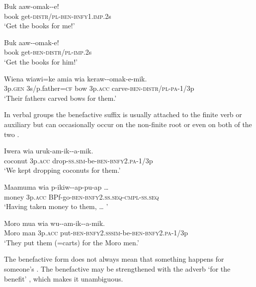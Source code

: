 \ea%
\label{ex:3:x1925}
\gll Buk aaw-omak--e! \\
book get-\textsc{distr}/\textsc{pl}-\textsc{ben}-\textsc{bnfy}1.\textsc{imp}.2s\\
\glt`Get the books for me!'
\z

\ea%
\label{ex:3:x211}
\gll Buk aaw--omak-e! \\
book get-\textsc{ben}-\textsc{distr}/\textsc{pl}-\textsc{imp}.2s \\
\glt`Get the books for him!'
\z

\ea%
\label{ex:3:x1926}
\gll Wiena wiawi=ke amia wia keraw--omak-e-mik. \\
3p.\textsc{gen} 3s/p.father=\textsc{cf} bow 3p.\textsc{acc} carve-\textsc{ben}-\textsc{distr}/\textsc{pl}-\textsc{pa}-1/3p \\
\glt`Their fathers carved bows for them.'
\z

In verbal groups the benefactive suffix is usually attached to the finite verb or auxiliary  but can occasionally occur on the non-finite root  or even on both of the two .

\ea%
\label{ex:3:x212}
\gll Iwera wia uruk-am-ik--a-mik. \\
coconut 3p.\textsc{acc} drop-\textsc{ss}.\textsc{sim}-be-\textsc{ben}-\textsc{bnfy}2.\textsc{pa}-1/3p\\
\glt`We kept dropping coconuts for them.' 
\z

\ea%
\label{ex:3:x213}
\gll Maamuma wia p-ikiw--ap-pu-ap {\dots} \\
money 3p.\textsc{acc} BPf-go-\textsc{ben}-\textsc{bnfy}2.\textsc{ss}.\textsc{seq}-\textsc{cmpl}-\textsc{ss}.\textsc{seq} \\
\glt`Having taken money to them, {\dots} '
\z

\ea%
\label{ex:3:x214}
\gll Moro mua wia wu--am-ik--a-mik. \\
Moro man 3p.\textsc{acc} put-\textsc{ben}-\textsc{bnfy}2.\textsc{ss}\textsc{sim}-be-\textsc{ben}-\textsc{bnfy}2.\textsc{pa}-1/3p\\
\glt`They put them (=carts) for the Moro men.' 
\z

The benefactive form does not always mean that something happens for someone's\textstyleEmphasizedWords{} . The benefactive may be strengthened with the adverb  `for the benefit' , which makes it unambiguous.


